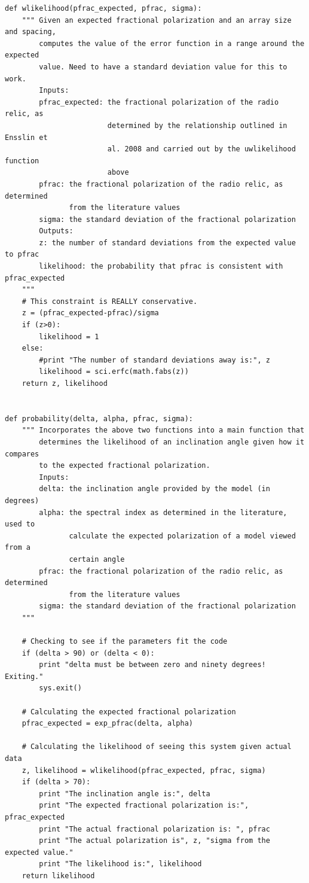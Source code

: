 \documentclass[12 pt]{article}
\begin{document}
\begin{verbatim}
def wlikelihood(pfrac_expected, pfrac, sigma):
    """ Given an expected fractional polarization and an array size and spacing,
        computes the value of the error function in a range around the expected
        value. Need to have a standard deviation value for this to work.
        Inputs:
        pfrac_expected: the fractional polarization of the radio relic, as
                        determined by the relationship outlined in Ensslin et
                        al. 2008 and carried out by the uwlikelihood function
                        above
        pfrac: the fractional polarization of the radio relic, as determined
               from the literature values
        sigma: the standard deviation of the fractional polarization
        Outputs:
        z: the number of standard deviations from the expected value to pfrac
        likelihood: the probability that pfrac is consistent with pfrac_expected
    """
    # This constraint is REALLY conservative.
    z = (pfrac_expected-pfrac)/sigma
    if (z>0):
        likelihood = 1
    else:
        #print "The number of standard deviations away is:", z
        likelihood = sci.erfc(math.fabs(z))
    return z, likelihood


def probability(delta, alpha, pfrac, sigma):
    """ Incorporates the above two functions into a main function that
        determines the likelihood of an inclination angle given how it compares
        to the expected fractional polarization.
        Inputs:
        delta: the inclination angle provided by the model (in degrees)
        alpha: the spectral index as determined in the literature, used to
               calculate the expected polarization of a model viewed from a
               certain angle
        pfrac: the fractional polarization of the radio relic, as determined
               from the literature values
        sigma: the standard deviation of the fractional polarization
    """
 
    # Checking to see if the parameters fit the code
    if (delta > 90) or (delta < 0):
        print "delta must be between zero and ninety degrees! Exiting."
        sys.exit()

    # Calculating the expected fractional polarization
    pfrac_expected = exp_pfrac(delta, alpha)
    
    # Calculating the likelihood of seeing this system given actual data
    z, likelihood = wlikelihood(pfrac_expected, pfrac, sigma)
    if (delta > 70):
        print "The inclination angle is:", delta
        print "The expected fractional polarization is:", pfrac_expected
        print "The actual fractional polarization is: ", pfrac
        print "The actual polarization is", z, "sigma from the expected value."
        print "The likelihood is:", likelihood
    return likelihood


\end{verbatim}
\end{document}
